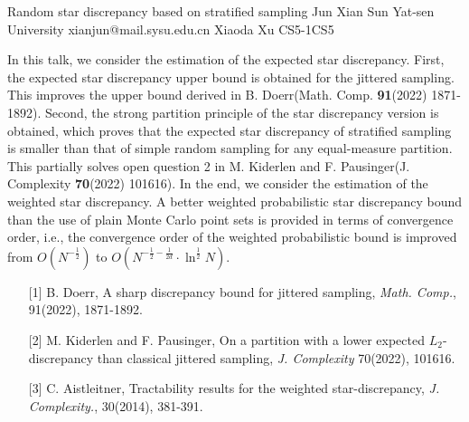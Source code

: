 \begin{talk}
  {Random star discrepancy based on stratified sampling}%
  {Jun Xian}%
  {Sun Yat-sen University}%
  {xianjun@mail.sysu.edu.cn}%
  {Xiaoda Xu}%
{}{}{CS5-1}{CS5}

			
In this talk, we consider the estimation of the expected star discrepancy. First, the expected star discrepancy  upper bound is obtained for the jittered sampling. This improves the upper bound derived in B. Doerr(Math. Comp. \textbf{91}(2022) 1871-1892). Second, the strong partition principle of the star discrepancy version is obtained, which proves that the expected star discrepancy of stratified sampling is smaller than that of simple random sampling for any equal-measure partition. This partially solves open question 2 in M. Kiderlen and F. Pausinger(J. Complexity \textbf{70}(2022) 101616). In the end, we consider the estimation of the weighted star discrepancy. A better weighted probabilistic star discrepancy bound than the use of plain Monte Carlo point sets is provided in terms of convergence order, i.e., the convergence order of the weighted probabilistic bound is improved from $O(N^{-\frac{1}{2}})$ to $O(N^{-\frac{1}{2}-\frac{1}{2d}}\cdot \ln^{\frac{1}{2}}{N})$.

\medskip

\begin{enumerate}
	\item[{[1]}] B. Doerr, A sharp discrepancy bound for jittered sampling, \emph{Math. Comp.}, 91(2022), 1871-1892.
	\item[{[2]}] M. Kiderlen and F. Pausinger, On a partition with a lower expected $L_2$-discrepancy than classical jittered sampling, \emph{J. Complexity} 70(2022), 101616.
        \item[{[3]}] C. Aistleitner, Tractability results for the weighted star-discrepancy, \emph{J. Complexity.}, 30(2014), 381-391.
      
\end{enumerate}

\end{talk}

